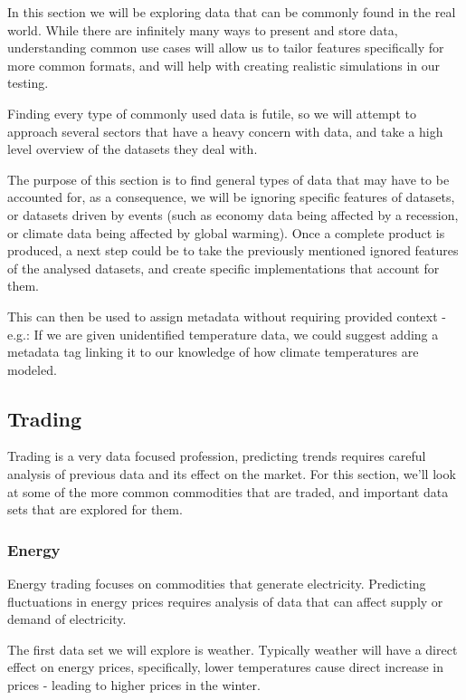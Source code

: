 In this section we will be exploring data that can be commonly found in the real world.
While there are infinitely many ways to present and store data, understanding common use cases will allow us to tailor
features specifically for more common formats, and will help with creating realistic simulations in our testing.

Finding every type of commonly used data is futile, so we will attempt to approach several sectors that have a heavy
concern with data, and take a high level overview of the datasets they deal with.

The purpose of this section is to find general types of data that may have to be accounted for, as a consequence, we
will be ignoring specific features of datasets, or datasets driven by events (such as economy data being affected by a
recession, or climate data being affected by global warming).
Once a complete product is produced, a next step could be to take the previously mentioned ignored features of the
analysed datasets, and create specific implementations that account for them.

This can then be used to assign metadata without requiring provided context - e.g.: If we are given unidentified
temperature data, we could suggest adding a metadata tag linking it to our knowledge of how climate temperatures are
modeled.

\subsection{Trading}

Trading is a very data focused profession, predicting trends requires careful analysis of previous data and its effect
on the market.
For this section, we'll look at some of the more common commodities that are traded, and important data sets that are
explored for them.

\subsubsection{Energy}

Energy trading focuses on commodities that generate electricity.
Predicting fluctuations in energy prices requires analysis of data that can affect supply or demand of electricity.

The first data set we will explore is weather.
Typically weather will have a direct effect on energy prices, specifically, lower temperatures cause direct increase
in prices - leading to higher prices in the winter.



